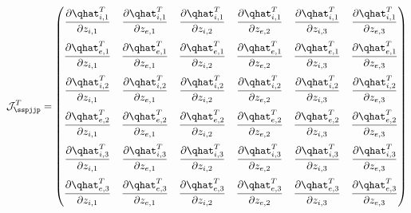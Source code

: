 \begin{equation}
{\cal J}^T_{\sspjjp} = \begin{pmatrix}
\displaystyle \frac{\partial \qhat^T_{i,1}}{\partial z_{i,1}} &
\displaystyle \frac{\partial \qhat^T_{i,1}}{\partial z_{e,1}} &
\displaystyle \frac{\partial \qhat^T_{i,1}}{\partial z_{i,2}} &
\displaystyle \frac{\partial \qhat^T_{i,1}}{\partial z_{e,2}} &
\displaystyle \frac{\partial \qhat^T_{i,1}}{\partial z_{i,3}} &
\displaystyle \frac{\partial \qhat^T_{i,1}}{\partial z_{e,3}} 
\medskip \\
\displaystyle \frac{\partial \qhat^T_{e,1}}{\partial z_{i,1}} &
\displaystyle \frac{\partial \qhat^T_{e,1}}{\partial z_{e,1}} &
\displaystyle \frac{\partial \qhat^T_{e,1}}{\partial z_{i,2}} &
\displaystyle \frac{\partial \qhat^T_{e,1}}{\partial z_{e,2}} &
\displaystyle \frac{\partial \qhat^T_{e,1}}{\partial z_{i,3}} &
\displaystyle \frac{\partial \qhat^T_{e,1}}{\partial z_{e,3}} 
\medskip \\
\displaystyle \frac{\partial \qhat^T_{i,2}}{\partial z_{i,1}} &
\displaystyle \frac{\partial \qhat^T_{i,2}}{\partial z_{e,1}} &
\displaystyle \frac{\partial \qhat^T_{i,2}}{\partial z_{i,2}} &
\displaystyle \frac{\partial \qhat^T_{i,2}}{\partial z_{e,2}} &
\displaystyle \frac{\partial \qhat^T_{i,2}}{\partial z_{i,3}} &
\displaystyle \frac{\partial \qhat^T_{i,2}}{\partial z_{e,3}} 
\medskip \\
\displaystyle \frac{\partial \qhat^T_{e,2}}{\partial z_{i,1}} &
\displaystyle \frac{\partial \qhat^T_{e,2}}{\partial z_{e,1}} &
\displaystyle \frac{\partial \qhat^T_{e,2}}{\partial z_{i,2}} &
\displaystyle \frac{\partial \qhat^T_{e,2}}{\partial z_{e,2}} &
\displaystyle \frac{\partial \qhat^T_{e,2}}{\partial z_{i,3}} &
\displaystyle \frac{\partial \qhat^T_{e,2}}{\partial z_{e,3}} 
\medskip \\
\displaystyle \frac{\partial \qhat^T_{i,3}}{\partial z_{i,1}} &
\displaystyle \frac{\partial \qhat^T_{i,3}}{\partial z_{e,1}} &
\displaystyle \frac{\partial \qhat^T_{i,3}}{\partial z_{i,2}} &
\displaystyle \frac{\partial \qhat^T_{i,3}}{\partial z_{e,2}} &
\displaystyle \frac{\partial \qhat^T_{i,3}}{\partial z_{i,3}} &
\displaystyle \frac{\partial \qhat^T_{i,3}}{\partial z_{e,3}} 
\medskip \\
\displaystyle \frac{\partial \qhat^T_{e,3}}{\partial z_{i,1}} &
\displaystyle \frac{\partial \qhat^T_{e,3}}{\partial z_{e,1}} &
\displaystyle \frac{\partial \qhat^T_{e,3}}{\partial z_{i,2}} &
\displaystyle \frac{\partial \qhat^T_{e,3}}{\partial z_{e,2}} &
\displaystyle \frac{\partial \qhat^T_{e,3}}{\partial z_{i,3}} &
\displaystyle \frac{\partial \qhat^T_{e,3}}{\partial z_{e,3}} 
\end{pmatrix}
\end{equation}
